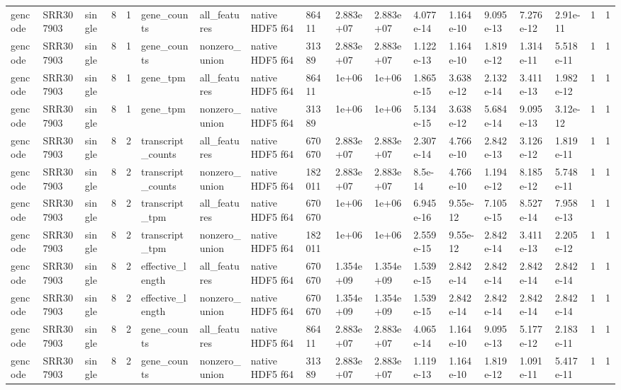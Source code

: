 \begin{tabular}{llllllllllllllllll}
gencode & SRR307903 & single & 8 & 1 & gene\_counts & all\_features & native HDF5 f64 & 86411 & 2.883e+07 & 2.883e+07 & 4.077e-14 & 1.164e-10 & 9.095e-13 & 7.276e-12 & 2.91e-11 & 1 & 1 \\
gencode & SRR307903 & single & 8 & 1 & gene\_counts & nonzero\_union & native HDF5 f64 & 31389 & 2.883e+07 & 2.883e+07 & 1.122e-13 & 1.164e-10 & 1.819e-12 & 1.314e-11 & 5.518e-11 & 1 & 1 \\
gencode & SRR307903 & single & 8 & 1 & gene\_tpm & all\_features & native HDF5 f64 & 86411 & 1e+06 & 1e+06 & 1.865e-15 & 3.638e-12 & 2.132e-14 & 3.411e-13 & 1.982e-12 & 1 & 1 \\
gencode & SRR307903 & single & 8 & 1 & gene\_tpm & nonzero\_union & native HDF5 f64 & 31389 & 1e+06 & 1e+06 & 5.134e-15 & 3.638e-12 & 5.684e-14 & 9.095e-13 & 3.12e-12 & 1 & 1 \\
gencode & SRR307903 & single & 8 & 2 & transcript\_counts & all\_features & native HDF5 f64 & 670670 & 2.883e+07 & 2.883e+07 & 2.307e-14 & 4.766e-10 & 2.842e-13 & 3.126e-12 & 1.819e-11 & 1 & 1 \\
gencode & SRR307903 & single & 8 & 2 & transcript\_counts & nonzero\_union & native HDF5 f64 & 182011 & 2.883e+07 & 2.883e+07 & 8.5e-14 & 4.766e-10 & 1.194e-12 & 8.185e-12 & 5.748e-11 & 1 & 1 \\
gencode & SRR307903 & single & 8 & 2 & transcript\_tpm & all\_features & native HDF5 f64 & 670670 & 1e+06 & 1e+06 & 6.945e-16 & 9.55e-12 & 7.105e-15 & 8.527e-14 & 7.958e-13 & 1 & 1 \\
gencode & SRR307903 & single & 8 & 2 & transcript\_tpm & nonzero\_union & native HDF5 f64 & 182011 & 1e+06 & 1e+06 & 2.559e-15 & 9.55e-12 & 2.842e-14 & 3.411e-13 & 2.205e-12 & 1 & 1 \\
gencode & SRR307903 & single & 8 & 2 & effective\_length & all\_features & native HDF5 f64 & 670670 & 1.354e+09 & 1.354e+09 & 1.539e-15 & 2.842e-14 & 2.842e-14 & 2.842e-14 & 2.842e-14 & 1 & 1 \\
gencode & SRR307903 & single & 8 & 2 & effective\_length & nonzero\_union & native HDF5 f64 & 670670 & 1.354e+09 & 1.354e+09 & 1.539e-15 & 2.842e-14 & 2.842e-14 & 2.842e-14 & 2.842e-14 & 1 & 1 \\
gencode & SRR307903 & single & 8 & 2 & gene\_counts & all\_features & native HDF5 f64 & 86411 & 2.883e+07 & 2.883e+07 & 4.065e-14 & 1.164e-10 & 9.095e-13 & 5.177e-12 & 2.183e-11 & 1 & 1 \\
gencode & SRR307903 & single & 8 & 2 & gene\_counts & nonzero\_union & native HDF5 f64 & 31389 & 2.883e+07 & 2.883e+07 & 1.119e-13 & 1.164e-10 & 1.819e-12 & 1.091e-11 & 5.417e-11 & 1 & 1 \\

\end{tabular}

